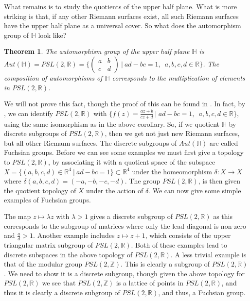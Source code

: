 \documentclass[11pt]{report}
\newtheorem{thm}{Theorem}[section]
\theoremstyle{definition}
\begin{document}
What remains is to study the quotients of the upper half plane. What is more striking is that, if any other Riemann surfaces exist, all such Riemann surfaces have the upper half plane as a universal cover. So what does the automorphism group of $\mathbb{H}$ look like?
\begin{thm}
  The automorphism group of the upper half plane $\mathbb{H}$ is ~\\ $Aut(\mathbb{H})=PSL(2,\mathbb{R}) = \Bigg\{ \begin{pmatrix} a & b\\ c & d \end{pmatrix} \ \Bigg\vert \ ad-bc = 1, \enspace a, b, c ,d \in \mathbb{\mathbb{R}}\Bigg\}$. The composition of automorphisms of $\mathbb{H}$ corresponds to the multiplication of elements in $PSL(2,\mathbb{R})$.
\end{thm} 
We will not prove this fact, though the proof of this can be found in \cite[Theorem 4.17.3 (iii)]{comfun}. In fact, by \cite[Theorem 2.9.1]{comfun}, we can identify $PSL(2,\mathbb{R})$ with $\bigl\{f(z) = \frac{az+b}{cz+d}\ \vert \ ad-bc = 1, \enspace a, b, c ,d \in \mathbb{R}\bigr\}$, using the same isomorphism as in the above corollary. So, if we quotient $\mathbb{H}$ by discrete subgroups of $PSL(2,\mathbb{R})$, then we get not just new Riemann surfaces, but all other Riemann surfaces. The discrete subgroups of $Aut(\mathbb{H})$ are called Fuchsian groups. Before we can see some examples we must first give a topology to $PSL(2,\mathbb{R})$, by associating it with a quotient space of the subspace $X = \{(a, b, c, d) \in \mathbb{R}^4 \ \vert \ ad-bc=1 \} \subset \mathbb{R}^4$ under the homeomorphism $\delta: X \rightarrow X$ where $\delta(a, b, c, d) = (-a, -b, -c, -d)$. The group $PSL(2,\mathbb{R})$, is then given the quotient topology of $X$ under the action of $\delta$.
We can now give some simple examples of Fuchsian groups. 

The map $z \mapsto \lambda z$ with $\lambda > 1$ gives a discrete subgroup of $PSL(2,\mathbb{R})$ as this corresponds to the subgroup of matrices where only the lead diagonal is non-zero and $\frac{a}{d} >1$. Another example includes $z \mapsto z + 1$, which consists of the upper triangular matrix subgroup of $PSL(2,\mathbb{R})$. Both of these examples lead to discrete subspaces in the above topology of $PSL(2,\mathbb{R})$. A less trivial example is that of the modular group $PSL(2,\mathbb{Z})$. This is clearly a subgroup of $PSL(2,\mathbb{R})$. We need to show it is a discrete subgroup, though given the above topology for $PSL(2,\mathbb{R})$ we see that $PSL(2,\mathbb{Z})$ is a lattice of points in $PSL(2,\mathbb{R})$, and thus it is clearly a discrete subgroup of $PSL(2,\mathbb{R})$, and thus, a Fuchsian group.
\end{document}
